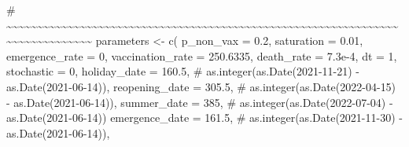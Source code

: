 \documentclass[
  11pt,
  letterpaper,
  DIV=11,
  numbers=noendperiod]{scrartcl}
\newenvironment{Shaded}{\begin{snugshade}}{\end{snugshade}}
\newcommand{\AttributeTok}[1]{\textcolor[rgb]{0.40,0.45,0.13}{#1}}
\newcommand{\CommentTok}[1]{\textcolor[rgb]{0.37,0.37,0.37}{#1}}
\newcommand{\DecValTok}[1]{\textcolor[rgb]{0.68,0.00,0.00}{#1}}
\newcommand{\FloatTok}[1]{\textcolor[rgb]{0.68,0.00,0.00}{#1}}
\newcommand{\FunctionTok}[1]{\textcolor[rgb]{0.28,0.35,0.67}{#1}}
\newcommand{\NormalTok}[1]{\textcolor[rgb]{0.00,0.23,0.31}{#1}}
\newcommand{\OtherTok}[1]{\textcolor[rgb]{0.00,0.23,0.31}{#1}}
\begin{document}
\begin{Shaded}
\begin{Highlighting}[]
\CommentTok{\# \textasciitilde{}\textasciitilde{}\textasciitilde{}\textasciitilde{}\textasciitilde{}\textasciitilde{}\textasciitilde{}\textasciitilde{}\textasciitilde{}\textasciitilde{}\textasciitilde{}\textasciitilde{}\textasciitilde{}\textasciitilde{}\textasciitilde{}\textasciitilde{}\textasciitilde{}\textasciitilde{}\textasciitilde{}\textasciitilde{}\textasciitilde{}\textasciitilde{}\textasciitilde{}\textasciitilde{}\textasciitilde{}\textasciitilde{}\textasciitilde{}\textasciitilde{}\textasciitilde{}\textasciitilde{}\textasciitilde{}\textasciitilde{}\textasciitilde{}\textasciitilde{}\textasciitilde{}\textasciitilde{}\textasciitilde{}\textasciitilde{}\textasciitilde{}\textasciitilde{}\textasciitilde{}\textasciitilde{}\textasciitilde{}\textasciitilde{}\textasciitilde{}\textasciitilde{}\textasciitilde{}\textasciitilde{}\textasciitilde{}\textasciitilde{}\textasciitilde{}\textasciitilde{}\textasciitilde{}\textasciitilde{}\textasciitilde{}\textasciitilde{}\textasciitilde{}\textasciitilde{}\textasciitilde{}\textasciitilde{}\textasciitilde{}\textasciitilde{}\textasciitilde{}\textasciitilde{}\textasciitilde{}\textasciitilde{}\textasciitilde{}\textasciitilde{}\textasciitilde{}\textasciitilde{}\textasciitilde{}\textasciitilde{}\textasciitilde{}\textasciitilde{}\textasciitilde{}\textasciitilde{}\textasciitilde{}\textasciitilde{}}
\NormalTok{parameters }\OtherTok{\textless{}{-}} \FunctionTok{c}\NormalTok{(}
    \AttributeTok{p\_non\_vax =} \FloatTok{0.2}\NormalTok{,}
    \AttributeTok{saturation =} \FloatTok{0.01}\NormalTok{,}
    \AttributeTok{emergence\_rate =} \DecValTok{0}\NormalTok{,}
    \AttributeTok{vaccination\_rate =} \FloatTok{250.6335}\NormalTok{,}
    \AttributeTok{death\_rate =} \FloatTok{7.3e{-}4}\NormalTok{,}
    \AttributeTok{dt =} \DecValTok{1}\NormalTok{,}
    \AttributeTok{stochastic =} \DecValTok{0}\NormalTok{,}
    \AttributeTok{holiday\_date =}  \FloatTok{160.5}\NormalTok{, }\CommentTok{\# as.integer(as.Date(\textquotesingle{}2021{-}11{-}21\textquotesingle{}) {-} as.Date(\textquotesingle{}2021{-}06{-}14\textquotesingle{})),}
    \AttributeTok{reopening\_date =}  \FloatTok{305.5}\NormalTok{, }\CommentTok{\# as.integer(as.Date(\textquotesingle{}2022{-}04{-}15\textquotesingle{}) {-} as.Date(\textquotesingle{}2021{-}06{-}14\textquotesingle{})),}
    \AttributeTok{summer\_date =}  \DecValTok{385}\NormalTok{, }\CommentTok{\# as.integer(as.Date(\textquotesingle{}2022{-}07{-}04\textquotesingle{}) {-} as.Date(\textquotesingle{}2021{-}06{-}14\textquotesingle{}))}
    \AttributeTok{emergence\_date =} \FloatTok{161.5}\NormalTok{, }\CommentTok{\# as.integer(as.Date(\textquotesingle{}2021{-}11{-}30\textquotesingle{}) {-} as.Date(\textquotesingle{}2021{-}06{-}14\textquotesingle{})),}

\end{Highlighting}
\end{Shaded}
\end{document}
